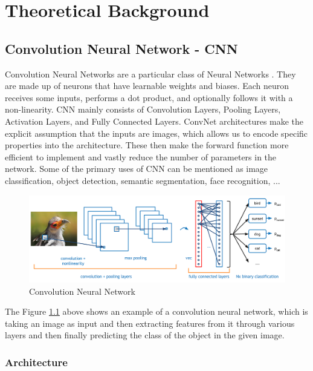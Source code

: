\chapter{Theoretical Background}

\section{Convolution Neural Network - CNN}

Convolution Neural Networks are a particular class of Neural Networks \cite{masood2018real}. They are made up of neurons that have learnable weights and biases. Each neuron receives some inputs, performs a dot product, and optionally follows it with a non-linearity. CNN mainly consists of Convolution Layers, Pooling Layers, Activation Layers, and Fully Connected Layers. ConvNet architectures make the explicit assumption that the inputs are images, which allows us to encode specific properties into the architecture. These then make the forward function more efficient to implement and vastly reduce the number of parameters in the network. Some of the primary uses of CNN can be mentioned as image classification, object detection, semantic segmentation, face recognition, ...

\begin{figure}[H]
	\centering
	\includegraphics[width=\textwidth]{img/Chap3/Cover.png}
	\caption{Convolution Neural Network}
	\label{fig:Chap3-OverviewTheCNN}
\end{figure}

The Figure \ref{fig:Chap3-OverviewTheCNN} above shows an example of a convolution neural network, which is taking an image as input and then extracting features from it through various layers and then finally predicting the class of the object in the given image.

\subsection{Architecture}


